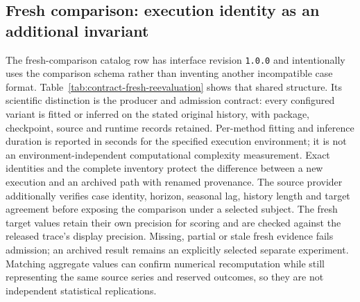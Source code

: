 \subsection{Fresh comparison: execution identity as an additional invariant}
\label{sec:contract-fresh-reevaluation}
The fresh-comparison catalog row has interface revision \texttt{1.0.0} and intentionally uses the comparison schema rather than inventing another incompatible case format. Table~\ref{tab:contract-fresh-reevaluation} shows that shared structure. Its scientific distinction is the producer and admission contract: every configured variant is fitted or inferred on the stated original history, with package, checkpoint, source and runtime records retained. Per-method fitting and inference duration is reported in seconds for the specified execution environment; it is not an environment-independent computational complexity measurement. Exact identities and the complete inventory protect the difference between a new execution and an archived path with renamed provenance. The source provider additionally verifies case identity, horizon, seasonal lag, history length and target agreement before exposing the comparison under a selected subject. The fresh target values retain their own precision for scoring and are checked against the released trace's display precision. Missing, partial or stale fresh evidence fails admission; an archived result remains an explicitly selected separate experiment. Matching aggregate values can confirm numerical recomputation while still representing the same source series and reserved outcomes, so they are not independent statistical replications.


